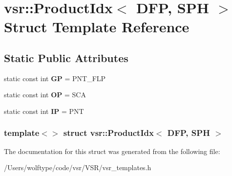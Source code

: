 \hypertarget{structvsr_1_1_product_idx_3_01_d_f_p_00_01_s_p_h_01_4}{\section{vsr\-:\-:Product\-Idx$<$ D\-F\-P, S\-P\-H $>$ Struct Template Reference}
\label{structvsr_1_1_product_idx_3_01_d_f_p_00_01_s_p_h_01_4}
}
\subsection*{Static Public Attributes}
\begin{DoxyCompactItemize}
\item 
\hypertarget{structvsr_1_1_product_idx_3_01_d_f_p_00_01_s_p_h_01_4_a3dac28983ab9f3b0824a6eb9a2440dd8}{static const int {\bfseries G\-P} = P\-N\-T\-\_\-\-F\-L\-P}\label{structvsr_1_1_product_idx_3_01_d_f_p_00_01_s_p_h_01_4_a3dac28983ab9f3b0824a6eb9a2440dd8}

\item 
\hypertarget{structvsr_1_1_product_idx_3_01_d_f_p_00_01_s_p_h_01_4_affffd8e1cadda97bdb9d3d191ad1a415}{static const int {\bfseries O\-P} = S\-C\-A}\label{structvsr_1_1_product_idx_3_01_d_f_p_00_01_s_p_h_01_4_affffd8e1cadda97bdb9d3d191ad1a415}

\item 
\hypertarget{structvsr_1_1_product_idx_3_01_d_f_p_00_01_s_p_h_01_4_a477f8bb4553a62810c7d3684b588ab92}{static const int {\bfseries I\-P} = P\-N\-T}\label{structvsr_1_1_product_idx_3_01_d_f_p_00_01_s_p_h_01_4_a477f8bb4553a62810c7d3684b588ab92}

\end{DoxyCompactItemize}
\subsubsection*{template$<$$>$ struct vsr\-::\-Product\-Idx$<$ D\-F\-P, S\-P\-H $>$}



The documentation for this struct was generated from the following file\-:\begin{DoxyCompactItemize}
\item 
/\-Users/wolftype/code/vsr/\-V\-S\-R/vsr\-\_\-templates.\-h\end{DoxyCompactItemize}
